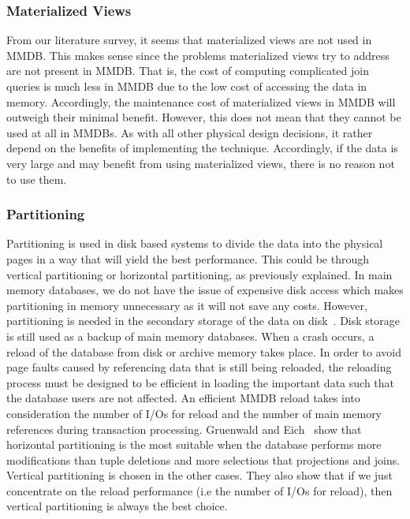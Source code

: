 \documentclass[12pt,a4paper]{article}
\begin{document}
\subsubsection{Materialized Views}
From our literature survey, it seems that materialized views are not used in MMDB. This makes sense since the problems materialized views try to address are
not present in MMDB. That is, the cost of computing complicated join queries is much less in MMDB due to the low cost of accessing the data in memory.
Accordingly, the maintenance cost of materialized views in MMDB will outweigh their minimal benefit. However, this does not mean that they cannot be used at
all in MMDBs. As with all other physical design decisions, it rather depend on the benefits of implementing the technique. Accordingly, if the data is very
large and may benefit from using materialized views, there is no reason not to use them.

\subsubsection{Partitioning}

Partitioning is used in disk based systems to divide the data into the physical pages in a way that will yield the best performance. This could be through
vertical partitioning or horizontal partitioning, as previously explained. In main memory databases, we do not have the issue of expensive disk access which
makes partitioning in memory unnecessary as it will not save any costs. However, partitioning is needed in the secondary storage of the data on
disk~\cite{gruenwald1990database}. Disk storage is still used as a backup of main memory databases. When a crash occurs, a reload of the database from disk or
archive memory takes place. In order to avoid page faults caused by referencing data that is still being reloaded, the reloading process must be designed to be
efficient in loading the important data such that the database users are not affected. An efficient MMDB reload takes into consideration the number of I/Os for
reload and the number of main memory references during transaction processing. Gruenwald and Eich~\cite{gruenwald1990database,gruenwald1990choosing} show that
horizontal partitioning is the most suitable when the database performs more modifications than tuple deletions and more selections that projections and joins.
Vertical partitioning is chosen in the other cases. They also show that if we just concentrate on the reload performance (i.e the number of I/Os for
reload), then vertical partitioning is always the best choice. 
\end{document}
